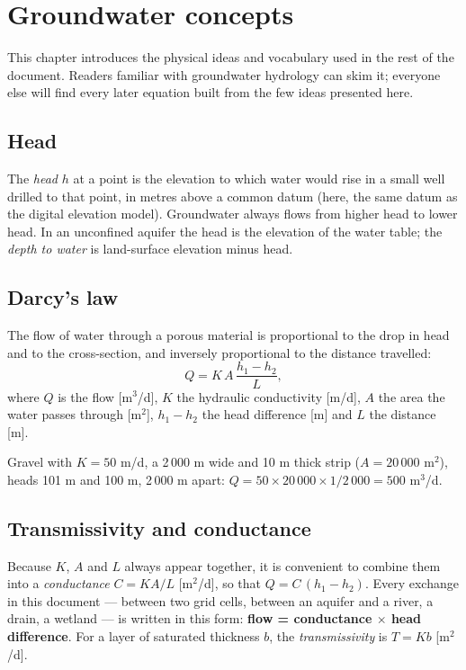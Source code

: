 \chapter{Groundwater concepts}\label{ch:c2}\label{ch:concepts}
This chapter introduces the physical ideas and vocabulary used in the rest of the document. Readers familiar with
groundwater hydrology can skim it; everyone else will find every later equation built from the few ideas presented here.


\section{Head}
The \emph{head} $h$ at a point is the elevation to which water would rise in a small well drilled to that point, in
metres above a common datum (here, the same datum as the digital elevation model). Groundwater always flows from
higher head to lower head. In an unconfined aquifer the head is the elevation of the water table; the \emph{depth to
water} is land-surface elevation minus head.

\section{Darcy's law}
The flow of water through a porous material is proportional to the drop in head and to the cross-section, and
inversely proportional to the distance travelled:
\begin{equation}
Q = K\,A\,\frac{h_1-h_2}{L},
\end{equation}
where $Q$ is the flow [m$^3$/d], $K$ the hydraulic conductivity [m/d], $A$ the area the water passes through [m$^2$],
$h_1-h_2$ the head difference [m] and $L$ the distance [m].

\begin{example}
Gravel with $K=50$ m/d, a 2\,000 m wide and 10 m thick strip ($A=20\,000$ m$^2$), heads 101 m and 100 m, 2\,000 m apart:
$Q=50\times20\,000\times1/2\,000=500$ m$^3$/d.
\end{example}

\section{Transmissivity and conductance}
Because $K$, $A$ and $L$ always appear together, it is convenient to combine them into a \emph{conductance}
$C = K A/L$ [m$^2$/d], so that $Q=C\,(h_1-h_2)$. Every exchange in this document --- between two grid cells, between an
aquifer and a river, a drain, a wetland --- is written in this form: \textbf{flow = conductance $\times$ head
difference}. For a layer of saturated thickness $b$, the \emph{transmissivity} is $T=Kb$ [m$^2$/d].

